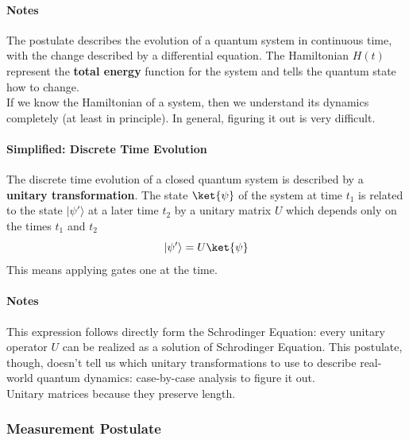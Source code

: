 \documentclass[10pt]{report}
\begin{document}
\paragraph{Notes} The postulate describes the evolution of a quantum system in continuous time, with the change described by a differential equation. The Hamiltonian $H(t)$ represent the \textbf{total energy} function for the system and tells the quantum state how to change.\\
If we know the Hamiltonian of a system, then we understand its dynamics completely (at least in principle). In general, figuring it out is very difficult.
\paragraph{Simplified: Discrete Time Evolution} The discrete time evolution of a closed quantum system is described by a \textbf{unitary transformation}. The state $\ket{\psi}$ of the system at time $t_1$ is related to the state $|\psi'\rangle$ at a later time $t_2$ by a unitary matrix $U$ which depends only on the times $t_1$ and $t_2$ $$|\psi'\rangle = U\ket{\psi}$$
This means applying gates one at the time.
\paragraph{Notes} This expression follows directly form the Schrodinger Equation: every unitary operator $U$ can be realized as a solution of Schrodinger Equation. This postulate, though, doesn't tell us which unitary transformations to use to describe real-world quantum dynamics: case-by-case analysis to figure it out.\\
Unitary matrices because they preserve length.
\subsubsection{Measurement Postulate}
\end{document}

